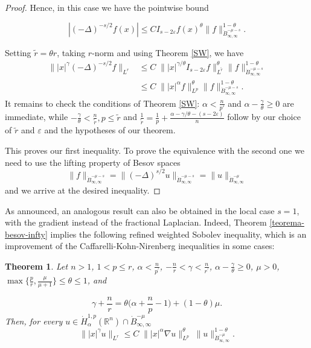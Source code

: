 \documentclass[12pt]{amsart}
\newcommand {\R}{\mathbb{R}}
\newtheorem{theorem}{Theorem}[section]
\begin{document}
\begin{proof}
Hence, in this case we have the pointwise bound

$$ |(-\Delta)^{-s/2} f(x)|\leq C I_{s-2\varepsilon}f(x)^\theta 
\| f \|_{\dot{B}^{-\mu-s}_{\infty,\infty}}^{1-\theta}. $$


Setting $\tilde{r}=\theta r$, taking $r$-norm and using Theorem \ref{SW}, we have 
\begin{align}
\| |x|^\gamma (-\Delta)^{-s/2} f \|_{L^r} &\leq 
C \; \| |x|^{\gamma/\theta} I_{s-2\varepsilon}f \|_{L^{\tilde{r}}}^\theta \| f
\|_{\dot{B}^{-\mu-s}_{\infty,\infty}}^{1-\theta} \nonumber \\
&\leq 
C \; \| |x|^{\alpha} f \|_{L^p}^\theta \| f \|_{\dot{B}^{-\mu-s}_{\infty,\infty}}^{1-\theta}.
\label{nuestra-desigualdad}
\end{align}
It remains to check the  conditions of Theorem \ref{SW}: $\alpha<\frac{n}{p'}$ and $\alpha-\frac{\gamma}{\theta} \ge 0$  are immediate, while $-\frac{\gamma}{\theta}<\frac{n}{\tilde r},  p\le \tilde r$ and $\frac{1}{\tilde{r}} = \frac{1}{p} +\frac{\alpha-\gamma{/\theta}-(s-2\varepsilon)}{n}$ follow by our choice  of $\tilde r$ and $\varepsilon$ and the hypotheses of our theorem.

This proves our first inequality. To prove  the equivalence with the second one we need to use the lifting property of Besov spaces 
$$ 
\| f
\|_{\dot{B}^{-\mu-s}_{\infty,\infty}} =
\| (-\Delta)^{s/2} u
\|_{\dot{B}^{-\mu-s}_{\infty,\infty}}  = 
\| u
\|_{\dot{B}^{-\mu}_{\infty,\infty}}  
$$
and we arrive at the desired inequality.

\end{proof}


As announced, an analogous result can also be obtained in the local case $s=1$, with the gradient instead of the 
fractional Laplacian. Indeed, Theorem \ref{teorema-besov-infty} implies the following refined 
weighted Sobolev inequality, which is an improvement of the Caffarelli-Kohn-Nirenberg inequalities 
\cite{CKN} in some cases:

\begin{theorem}
\label{teorema-besov-local-case}
Let $n>1$, $1<p\le r$, $\alpha<\frac{n}{p^\prime}$, $-\frac{n}{r}<\gamma<\frac{n}{r^\prime}$, 
$\alpha- \frac{\gamma}{\theta} \geq 0$, $\mu>0$,
$ \max\{\frac{p}{r},\frac{\mu}{\mu+1}\} \le \theta \le 1$, and 

\begin{equation*}
 \gamma + \frac{n}{r}= \theta \Big(\alpha + \frac{n}{p}-1 \Big) + (1-\theta) \mu.
\end{equation*}
Then, for every $u\in  \dot{H}^{1,p}_\alpha(\R^n) \cap 
\dot{B}^{-\mu}_{\infty,\infty} $ 
\begin{equation*}
 \| |x|^\gamma u \|_{L^r} \leq 
C \; \| |x|^{\alpha} \nabla u  \|_{L^p}^\theta \;  \| u \|_{\dot{B}^{-\mu}_{\infty,\infty}}^{1-\theta}.
\end{equation*}
\end{theorem}
\end{document}
